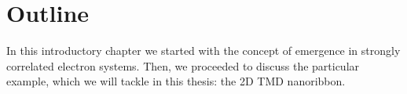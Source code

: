 \section{Outline}
\label{sec:int_outline}

In this introductory chapter we started with the concept of emergence in strongly correlated electron systems.
Then, we proceeded to discuss the particular example, which we will tackle in this thesis: the \acs{2D} \acs{TMD} nanoribbon.